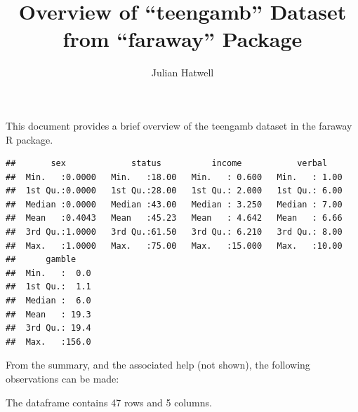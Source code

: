 \documentclass{article}\usepackage[]{graphicx}\usepackage[]{color}
\makeatletter
\newenvironment{kframe}{%
 \def\at@end@of@kframe{}%
 \ifinner\ifhmode%
  \def\at@end@of@kframe{\end{minipage}}%
  \begin{minipage}{\columnwidth}%
 \fi\fi%
 \def\FrameCommand##1{\hskip\@totalleftmargin \hskip-\fboxsep
 \colorbox{shadecolor}{##1}\hskip-\fboxsep
     \hskip-\linewidth \hskip-\@totalleftmargin \hskip\columnwidth}%
 \MakeFramed {\advance\hsize-\width
   \@totalleftmargin\z@ \linewidth\hsize
   \@setminipage}}%
 {\par\unskip\endMakeFramed%
 \at@end@of@kframe}
\newenvironment{knitrout}{}{} %
\makeatother
\begin{document}
\title{Overview of 
``teengamb'' 
Dataset from 
``faraway''
Package}
\author{Julian Hatwell}
\maketitle

This document provides a brief overview of the
teengamb dataset in the 
faraway R package.

\begin{knitrout}
\color{fgcolor}\begin{kframe}
\begin{verbatim}
##       sex             status          income           verbal     
##  Min.   :0.0000   Min.   :18.00   Min.   : 0.600   Min.   : 1.00  
##  1st Qu.:0.0000   1st Qu.:28.00   1st Qu.: 2.000   1st Qu.: 6.00  
##  Median :0.0000   Median :43.00   Median : 3.250   Median : 7.00  
##  Mean   :0.4043   Mean   :45.23   Mean   : 4.642   Mean   : 6.66  
##  3rd Qu.:1.0000   3rd Qu.:61.50   3rd Qu.: 6.210   3rd Qu.: 8.00  
##  Max.   :1.0000   Max.   :75.00   Max.   :15.000   Max.   :10.00  
##      gamble     
##  Min.   :  0.0  
##  1st Qu.:  1.1  
##  Median :  6.0  
##  Mean   : 19.3  
##  3rd Qu.: 19.4  
##  Max.   :156.0
\end{verbatim}
\end{kframe}
\end{knitrout}

From the summary, and the associated help (not shown), the following observations can be made:
\newline

The dataframe contains 
47 
rows and 
5
columns. 

\newpage
\end{document}
